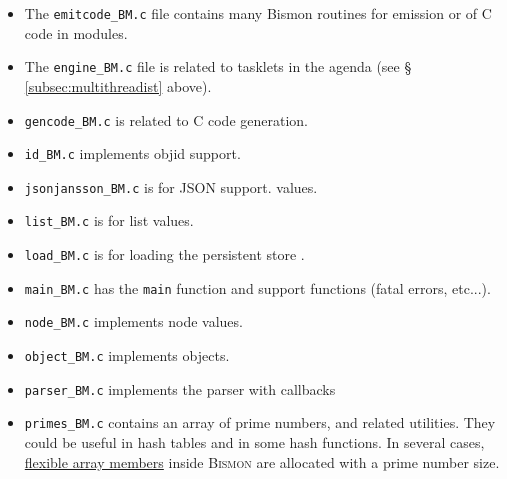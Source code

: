 \begin{appendices}
\begin{itemize}
  \item The \texttt{emitcode\_BM.c} file contains many Bismon routines
    for  emission or  of C code in
     modules.

  \item The \texttt{engine\_BM.c} file is related to  tasklets 
     in the agenda (see \S
    \ref{subsec:multithreadist} above).

  \item \texttt{gencode\_BM.c} is related
     to C code
    generation.  

  \item \texttt{id\_BM.c} implements objid 
     support.

  \item \texttt{jsonjansson\_BM.c} is for JSON 
     support.
    values.

  \item \texttt{list\_BM.c} is for list 
      values.

  \item \texttt{load\_BM.c} is for loading the persistent store
   .

  \item \texttt{main\_BM.c} has the \texttt{main} function 
     and support functions (fatal errors, etc...).

  \item \texttt{node\_BM.c} implements node values. 

  \item \texttt{object\_BM.c} implements
    objects. 
     

  \item \texttt{parser\_BM.c} implements the parser
     with callbacks

  \item \texttt{primes\_BM.c} contains an array of prime numbers,
     and related
    utilities. They could be useful in hash tables 
    and in some hash functions. In several cases,
    \href{https://en.wikipedia.org/wiki/Flexible_array_member}{flexible
      array members} inside \textsc{Bismon} are allocated with a prime
    number size.  


\end{itemize}
\end{appendices}
